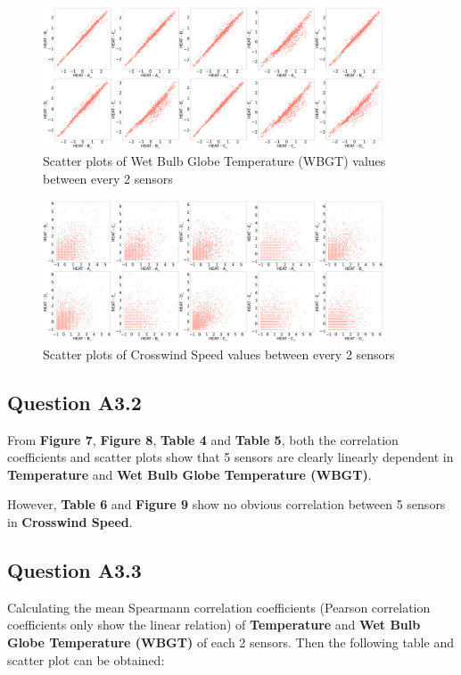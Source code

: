 \documentclass[a4paper]{article}
\begin{document}
\begin{figure}[htbp]
\centering
\includegraphics[width=0.9\textwidth]{images/scatter_WBGT.png} 
\caption{Scatter plots of Wet Bulb Globe Temperature (WBGT) values between every 2 sensors}
\end{figure}

\begin{figure}[htbp]
\centering
\includegraphics[width=0.9\textwidth]{images/scatter_CS.png} 
\caption{Scatter plots of Crosswind Speed values between every 2 sensors}
\end{figure}

\subsection{Question A3.2}
\noindent From \textbf{Figure 7},  \textbf{Figure 8}, \textbf{Table 4} and  \textbf{Table 5}, both the correlation coefficients and scatter plots show that 5 sensors are clearly linearly dependent in \textbf{Temperature} and \textbf{Wet Bulb Globe Temperature (WBGT)}.  

\noindent However, \textbf{Table 6} and  \textbf{Figure 9} show no obvious correlation between 5 sensors in \textbf{Crosswind Speed}.

\subsection{Question A3.3}
\noindent Calculating the mean Spearmann correlation coefficients (Pearson correlation coefficients only show the linear relation) of \textbf{Temperature} and \textbf{Wet Bulb Globe Temperature (WBGT)} of each 2 sensors. Then the following table and scatter plot can be obtained:
\end{document}
